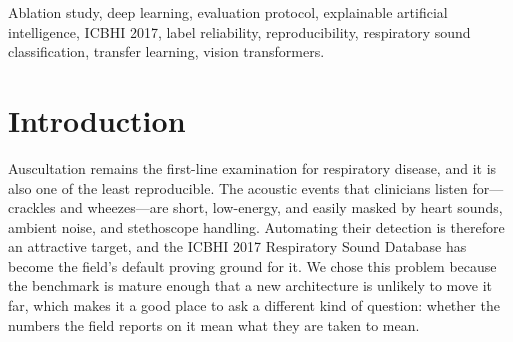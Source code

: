 \documentclass[journal,onecolumn]{IEEEtran}
\begin{document}
\begin{abstract}
the gate failed on, above the threshold that gate had set. The labels are therefore
learnable, and we retract---against a reading pre-registered before the probe was
run---the claim that label reliability bounds concept-level detection. Our detectors
were weak, and we say so. What survives is sharper: on the same cycles a physician
agrees with these labels at $\kappa=0.035$ for crackles, reproducing the twenty-three
percent sensitivity of the published seven-physician study, so machines reproduce this
reference standard substantially better than trained listeners agree with it. We
further report a non-replication of our own: an interpretability cost we had recorded
from a single random initialisation reverses sign across five, and we withdraw it. We
release the corrected split loader, a canonical score format with paired significance
tests, and the audit tool that detects all four faults. Evaluated on the published
partition our best model reaches 0.5641, level with the strongest convolutional systems
in the literature; its sensitivity matches systems six points ahead of it on the
composite score, and the whole of its deficit is specificity. The contribution is a
measurement rather than a mechanism.
\end{abstract}

\begin{IEEEkeywords}
Ablation study, deep learning, evaluation protocol, explainable artificial
intelligence, ICBHI 2017, label reliability, reproducibility, respiratory sound
classification, transfer learning, vision transformers.
\end{IEEEkeywords}

\section{Introduction}
\label{sec:intro}

Auscultation remains the first-line examination for respiratory disease, and it is
also one of the least reproducible. The acoustic events that clinicians listen
for---crackles and wheezes---are short, low-energy, and easily masked by heart
sounds, ambient noise, and stethoscope handling. Automating their detection is
therefore an attractive target, and the ICBHI 2017 Respiratory Sound Database has
become the field's default proving ground for it. We chose this problem because the
benchmark is mature enough that a new architecture is unlikely to move it far, which
makes it a good place to ask a different kind of question: whether the numbers the
field reports on it mean what they are taken to mean.
\end{document}
